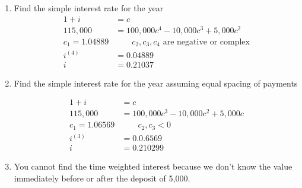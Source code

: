 \documentclass[a4paper, 12pt, reqno]{amsart}
\numberwithin{equation}{section}
\begin{document}
\begin{enumerate}[label=(\alph*)]
    \item Find the simple interest rate for the year
        \begin{equation}\nonumber
            \begin{aligned}
                1 + i &= c  \\
                115,000 &= 100,000c^{4} - 10,000c^3 + 5,000c^2    \\
                c_1 = 1.04889 &\qquad c_2,c_3,c_4 \text{ are negative or
                    complex}      \\
                i^{(4)} &= 0.04889  \\
                i &= 0.21037
            \end{aligned}
        \end{equation}
    \item Find the simple interest rate for the year assuming equal spacing of
        payments
        \begin{center}
        \end{center}
        \begin{equation}\nonumber
            \begin{aligned}
                1 + i &= c  \\
                115,000 &= 100,000c^{3} - 10,000c^2 + 5,000c    \\
                c_1 = 1.06569 &\qquad c_2,c_3 < 0       \\
                i^{(3)} &= 0.0.6569 \\
                i &= 0.210299
            \end{aligned}
        \end{equation}
    \item You cannot find the time weighted interest because we don't know the
        value immediately before or after the deposit of 5,000.
\end{enumerate}
\end{document}
